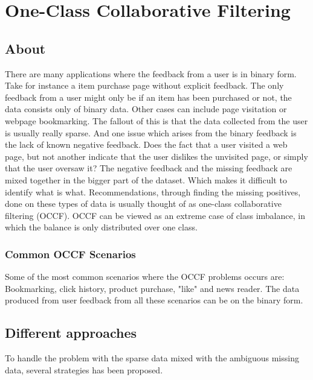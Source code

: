 \section{One-Class Collaborative Filtering}


\subsection{About}
    There are many applications where the feedback from a user is in binary form.
    Take for instance a item purchase page without explicit feedback.  The only
    feedback from a user might only be if an item has been purchased or not, the
    data consists only of binary data.  Other cases can include page visitation or
    webpage bookmarking.  The fallout of this is that the data collected from the
    user is usually really sparse.  And one issue which arises from the binary
    feedback is the lack of known negative feedback.  Does the fact that a user
    visited a web page, but not another indicate that the user dislikes the
    unvisited page, or simply that the user oversaw it?  The negative feedback and
    the missing feedback are mixed together in the bigger part of the dataset.
    Which makes it difficult to identify what is what.  Recommendations, through
    finding the missing positives, done on these types of data is usually thought
    of as one-class collaborative filtering (OCCF).  OCCF can be viewed as an
    extreme case of class imbalance, in which the balance is only distributed over
    one class. 

\subsubsection{Common OCCF Scenarios}
    Some of the most common scenarios where the OCCF problems occurs are:
    Bookmarking, click history, product purchase, "like" and news reader.  The data
    produced from user feedback from all these scenarios can be on the binary form.

\subsection{Different approaches}
    To handle the problem with the sparse data mixed with the ambiguous missing
    data, several strategies has been proposed.

